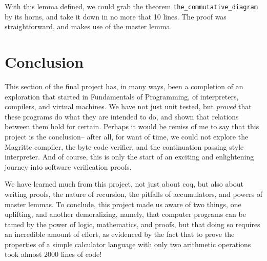 \documentclass[12pt, a4paper]{article}
\begin{document}
With this lemma defined, we could grab the theorem \verb-the_commutative_diagram-
by its horns, and take it down in no more that 10 lines. The proof was
straightforward, and makes use of the master lemma.


\section{Conclusion}

This section of the final project has, in many ways, been a completion of an 
exploration that started in Fundamentals of Programming, of interpreters, compilers,
and virtual machines. We have not just unit tested, but \textit{proved} that these
programs do what they are intended to do, and shown that relations between them
hold for certain. Perhaps it would be remiss of me to say that this project is the
conclusion-- after all, for want of time, we could not explore the Magritte 
compiler, the byte code verifier, and the continuation passing style interpreter. And
of course, this is only the start of an exciting and enlightening journey into 
software verification proofs.

We have learned much from this project, not just about coq, but also about writing
proofs, the nature of recursion, the pitfalls of accumulators, and powers of 
master lemmas. To conclude, this
project made us aware of two things, one uplifting, and another demoralizing, namely,
that computer programs can be tamed by the power of logic, mathematics, and proofs,
but that doing so requires an incredible amount of effort, as evidenced by the fact 
that to prove the properties of a simple calculator language with only two 
arithmetic operations took almost 2000 lines of code! 
\end{document}
